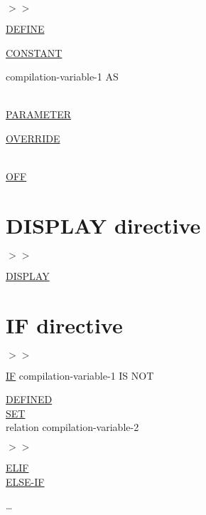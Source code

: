 \documentclass[a4paper,oneside,svgnames]{scrbook}
\makeatletter
\newcommand{\key}[1]{\underline{#1}}
\newcommand{\directiveindicator}[0]{$>\!>$}
\newcommand{\gnucobol}[1]{%
  \colorbox{orange!75}{#1}}
\newcommand{\miscext}[1]{%
  \colorbox{blue!50}{#1}}
\newenvironment{0-1}{$\left[ \begin{tabular}{@{}l@{}}}{\end{tabular} \right]$}
\newenvironment{1=}{$\left\{ \begin{tabular}{@{}l@{}}}{\end{tabular} \right\}$}
\makeatother
\begin{document}
\begin{1=}
  \directiveindicator \\
  \miscext{\textdollar}
\end{1=}
\key{DEFINE}
\gnucobol{
  \begin{0-1}
    \key{CONSTANT}
  \end{0-1}
}
compilation-variable-1 AS
\begin{1=}
  \begin{1=}
      \literal \\
      \key{PARAMETER}
  \end{1=}
  \begin{0-1}
    \key{OVERRIDE}
  \end{0-1} \\
  \key{OFF}
\end{1=}

\section{DISPLAY directive}

\miscext{
  \begin{1=}
    \directiveindicator \\
    \textdollar
  \end{1=}
  \key{DISPLAY} \sourcetext
}

\section{IF directive}

\begin{1=}
  \directiveindicator \\
  \miscext{\textdollar}
\end{1=}
\key{IF} compilation-variable-1 IS NOT
\begin{1=}
  \key{DEFINED} \\
  \key{SET} \\
  relation compilation-variable-2
\end{1=}

\sourcetext


\miscext{
  \begin{0-1}
    \begin{1=}
      \gnucobol{\directiveindicator} \\
      \textdollar
    \end{1=}
    \begin{1=}
      \key{ELIF} \\
      \key{ELSE-IF}
    \end{1=}
    \condition
    \sourcetext
  \end{0-1} \ldots
}
\end{document}
